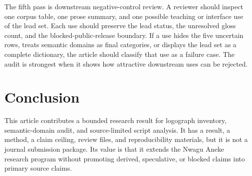 \documentclass[sigconf,nonacm]{acmart}
\begin{document}
The fifth pass is downstream negative-control review. A reviewer should inspect
one corpus table, one prose summary, and one possible teaching or interface use
of the lead set. Each use should preserve the lead status, the unresolved gloss
count, and the blocked-public-release boundary. If a use hides the five
uncertain rows, treats semantic domains as final categories, or displays the
lead set as a complete dictionary, the article should classify that use as a
failure case. The audit is strongest when it shows how attractive downstream
uses can be rejected.

\section{Conclusion}
This article contributes a bounded research result for logograph inventory,
semantic-domain audit, and source-limited script analysis. It has a result, a
method, a claim ceiling, review files, and reproducibility materials, but it is
not a journal submission package. Its value is that it extends the Nwagu Aneke
research program without promoting derived, speculative, or blocked claims into
primary source claims.



\end{document}
